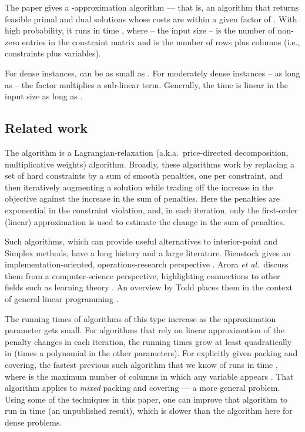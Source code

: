 \documentclass[11pt]{svjour3} \usepackage{fullpage}
\begin{document}
The paper gives a -approximation algorithm ---
that is, an algorithm that returns feasible primal and dual solutions whose costs are within a given factor  of .
With high probability, it runs in time
, where  -- the input size -- is the number of non-zero entries in the constraint matrix and  is the number of rows plus columns (i.e., constraints plus variables).  

For dense instances,  can be as small as .
For moderately dense instances -- as long as  --
the  factor multiplies a sub-linear term.
Generally, the time is linear in the input size  as long as .

\subsection{Related work}
The algorithm is a Lagrangian-relaxation (a.k.a.~price-directed decomposition, multiplicative weights) algorithm.
Broadly, these algorithms work by replacing a set of hard constraints by a sum of smooth penalties, one per constraint, and then iteratively augmenting a solution while trading off the increase in the objective against the increase in the sum of penalties.
Here the penalties are exponential in the constraint violation,
and, in each iteration, only the first-order (linear) approximation 
is used to estimate the change in the sum of penalties.

Such algorithms, which can provide useful alternatives to interior-point and Simplex methods,  have a long history and a large literature.
Bienstock gives an implementation-oriented, operations-research perspective \cite{Bienstock00Potential}.  
Arora {\em et al.}\ discuss them from a computer-science perspective, highlighting connections to other fields such as learning theory \cite{arora2012multiplicative}.
An overview by Todd places them in the context of general linear programming \cite{todd2002mfl}.

The running times of algorithms of this type increase as the approximation parameter  gets small.   For algorithms that rely on linear approximation of the penalty changes in each iteration, the running times grow at least quadratically in  (times a polynomial in the other parameters).  For explicitly given packing and covering, the fastest previous such algorithm that we know of runs in time , where  is the maximum number of columns in which any variable appears \cite{Young01Sequential}.  
That algorithm applies to {\em mixed} packing and covering --- a more general problem.
Using some of the techniques in this paper, one can improve that algorithm to run in time  (an unpublished result),
which is slower than the algorithm here for dense problems.
\end{document}
